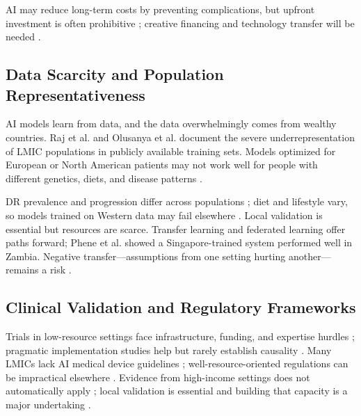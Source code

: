 AI may reduce long-term costs by preventing complications, but upfront investment is often prohibitive \cite{mackenzie2023diabetes, guan2023artificial}; creative financing and technology transfer will be needed \cite{ghosh2025artificial}.

\subsection{Data Scarcity and Population Representativeness}

AI models learn from data, and the data overwhelmingly comes from wealthy countries. Raj et al. \cite{raj2024federated} and Olusanya et al. \cite{olusanya2024mitigating} document the severe underrepresentation of LMIC populations in publicly available training sets. Models optimized for European or North American patients may not work well for people with different genetics, diets, and disease patterns \cite{wang2024ai, zhang2025systematic}.

DR prevalence and progression differ across populations \cite{yau2012global, zhang2025systematic}; diet and lifestyle vary, so models trained on Western data may fail elsewhere \cite{ghosh2025artificial}. Local validation is essential but resources are scarce. Transfer learning \cite{contreras2018artificial, chen2024crossmodality} and federated learning \cite{bai2024federated, fahmy2025exploring} offer paths forward; Phene et al. \cite{phene2019artificial} showed a Singapore-trained system performed well in Zambia. Negative transfer—assumptions from one setting hurting another—remains a risk \cite{prioleau2025deep}.

\subsection{Clinical Validation and Regulatory Frameworks}

Trials in low-resource settings face infrastructure, funding, and expertise hurdles \cite{mackenzie2023diabetes, fahmy2025exploring}; pragmatic implementation studies help but rarely establish causality \cite{mackenzie2023diabetes}. Many LMICs lack AI medical device guidelines \cite{mackenzie2023diabetes, khalifa2024artificial}; well-resource-oriented regulations can be impractical elsewhere \cite{ghosh2025artificial}. Evidence from high-income settings does not automatically apply \cite{cappon2024digital, fahmy2025exploring}; local validation is essential and building that capacity is a major undertaking \cite{mackenzie2023diabetes}.

